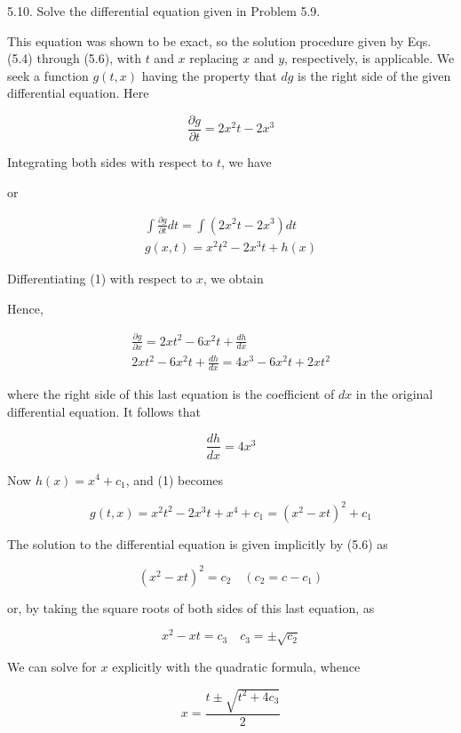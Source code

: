 \documentclass[10pt]{article}
\begin{document}
5.10. Solve the differential equation given in Problem 5.9.

This equation was shown to be exact, so the solution procedure given by Eqs. (5.4) through (5.6), with $t$ and $x$ replacing $x$ and $y$, respectively, is applicable. We seek a function $g(t, x)$ having the property that $d g$ is the right side of the given differential equation. Here

$$
\frac{\partial g}{\partial t}=2 x^{2} t-2 x^{3}
$$

Integrating both sides with respect to $t$, we have

or


\begin{gather*}
\int \frac{\partial g}{\partial t} d t=\int\left(2 x^{2} t-2 x^{3}\right) d t \\
g(x, t)=x^{2} t^{2}-2 x^{3} t+h(x) \tag{1}
\end{gather*}


Differentiating (1) with respect to $x$, we obtain

Hence,

$$
\begin{gathered}
\frac{\partial g}{\partial x}=2 x t^{2}-6 x^{2} t+\frac{d h}{d x} \\
2 x t^{2}-6 x^{2} t+\frac{d h}{d x}=4 x^{3}-6 x^{2} t+2 x t^{2}
\end{gathered}
$$

where the right side of this last equation is the coefficient of $d x$ in the original differential equation. It follows that

$$
\frac{d h}{d x}=4 x^{3}
$$

Now $h(x)=x^{4}+c_{1}$, and (1) becomes

$$
g(t, x)=x^{2} t^{2}-2 x^{3} t+x^{4}+c_{1}=\left(x^{2}-x t\right)^{2}+c_{1}
$$

The solution to the differential equation is given implicitly by (5.6) as

$$
\left(x^{2}-x t\right)^{2}=c_{2} \quad\left(c_{2}=c-c_{1}\right)
$$

or, by taking the square roots of both sides of this last equation, as


\begin{equation*}
x^{2}-x t=c_{3} \quad c_{3}= \pm \sqrt{c_{2}} \tag{2}
\end{equation*}


We can solve for $x$ explicitly with the quadratic formula, whence

$$
x=\frac{t \pm \sqrt{t^{2}+4 c_{3}}}{2}
$$
\end{document}
